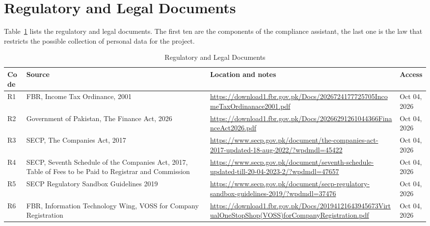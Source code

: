 \documentclass{FastFyp}
\begin{document}
\FloatBarrier

\section{Regulatory and Legal Documents}\label{sec:regdocs}
Table~\ref{tab:src-regulatory} lists the regulatory and legal documents. The first ten are the components of the compliance assistant, the last one is the law that restricts the possible collection of personal data for the project.

\begin{table}[!ht]
\centering
\caption{Regulatory and Legal Documents}
\label{tab:src-regulatory}
\small
\setlength{\tabcolsep}{3pt}
\renewcommand{\arraystretch}{1.25}
\begin{tabular}{|p{}|p{}|p{}|p{}|}

\hline
\textbf{Code} & \textbf{Source} & \textbf{Location and notes} & \textbf{Access} \\ \hline
R1 & FBR, Income Tax Ordinance, 2001 & \url{https://download1.fbr.gov.pk/Docs/2026724177725705IncomeTaxOrdinanace2001.pdf} & Oct 04, 2026 \\ \hline

R2 & Government of Pakistan, The Finance Act, 2026 & \url{https://download1.fbr.gov.pk/Docs/20266291261044366FinanceAct2026.pdf} & Oct 04, 2026 \\ \hline

R3 & SECP, The Companies Act, 2017 & \url{https://www.secp.gov.pk/document/the-companies-act-2017-updated-18-aug-2022/?wpdmdl=45422} & Oct 04, 2026 \\ \hline

R4 & SECP, Seventh Schedule of the Companies Act, 2017, Table of Fees to be Paid to Registrar and Commission & \url{https://www.secp.gov.pk/document/seventh-schedule-updated-till-20-04-2023-2/?wpdmdl=47657} & Oct 04, 2026 \\ \hline

R5 & SECP Regulatory Sandbox Guidelines 2019 & \url{https://www.secp.gov.pk/document/secp-regulatory-sandbox-guidelines-2019/?wpdmdl=37476} & Oct 04, 2026 \\ \hline

R6 & FBR, Information Technology Wing, VOSS for Company Registration & \url{https://download1.fbr.gov.pk/Docs/20194121643945673VirtualOneStopShop(VOSS)forCompanyRegistration.pdf} & Oct 04, 2026 \\ \hline


\end{tabular}
\end{table}
\end{document}

